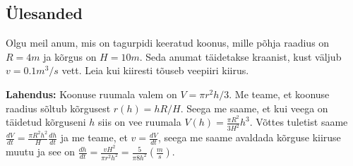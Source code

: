 \documentclass[a4paper,11pt,twocolumn]{article}
\begin{document}
\subsection{Ülesanded}
\begin{question}
Olgu meil anum, mis on tagurpidi keeratud koonus, mille põhja raadius on $R = 4 m$ ja kõrgus on $H = 10 m$. Seda anumat täidetakse kraanist, kust väljub $v = 0.1 m^3/s$ vett. Leia kui kiiresti tõuseb veepiiri kiirus.
\end{question}

\textbf{Lahendus:} Koonuse ruumala valem on $V=\pi r^2h/3$. Me teame, et koonuse raadius sõltub kõrgusest $r(h)=hR/H$. Seega me saame, et kui veega on täidetud kõrguseni $h$ siis on vee ruumala $V(h)=\frac{\pi R^2}{3H^2}h^3$. Võttes tuletist saame $\frac{dV}{dt} = \frac{\pi R^2h^2}{H} \frac{dh}{dt}$ ja me teame, et $v= \frac{dV}{dt}$, seega me saame avaldada kõrguse kiiruse muutu ja see on $\frac{dh}{dt} = \frac{v H^2}{\pi r^2 h^2} = \frac{5}{\pi 8 h^2} (\frac{m}{s})$.
\end{document}
